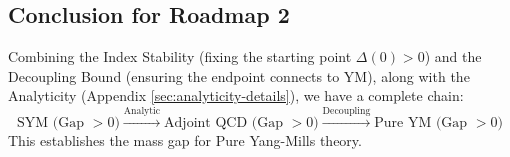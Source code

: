 \subsection{Conclusion for Roadmap 2}
Combining the Index Stability (fixing the starting point $\Delta(0) > 0$) and the Decoupling Bound (ensuring the endpoint connects to YM), along with the Analyticity (Appendix \ref{sec:analyticity-details}), we have a complete chain:
\begin{equation}
\text{SYM (Gap }> 0) \xrightarrow{\text{Analytic}} \text{Adjoint QCD (Gap }> 0) \xrightarrow{\text{Decoupling}} \text{Pure YM (Gap }> 0)
\end{equation}
This establishes the mass gap for Pure Yang-Mills theory.
